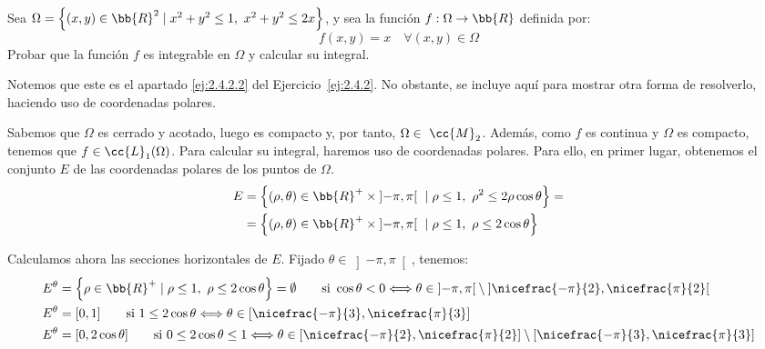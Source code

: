\begin{ejercicio}
    Sea $\Omega=\left\{(x,y)\in \bb{R}^2 \mid x^2+y^2\leq 1,~x^2+y^2\leq 2x\right\}$, y sea la función $f:\Omega\to \bb{R}$ definida por:
    \[ f(x,y) = x \quad \forall (x,y)\in \Omega \]
    Probar que la función \( f \) es integrable en \( \Omega \) y calcular su integral.

    \begin{observacion}
        Notemos que este es el apartado \ref{ej:2.4.2.2} del Ejercicio~\ref{ej:2.4.2}.
        No obstante, se incluye aquí para mostrar otra forma de resolverlo, haciendo uso de coordenadas polares.
    \end{observacion}

    Sabemos que $\Omega$ es cerrado y acotado, luego es compacto y, por tanto, $\Omega\in~\cc{M}_2$. Además, como $f$ es continua y $\Omega$ es compacto, tenemos que $f\in \cc{L}_1(\Omega)$.
    Para calcular su integral, haremos uso de coordenadas polares. Para ello, en primer lugar, obtenemos el conjunto $E$ de las coordenadas polares de los puntos de $\Omega$.
    \begin{align*}
        E &= \left\{ (\rho, \theta) \in \bb{R}^+\times \left]-\pi, \pi\right[ ~\mid \rho\leq 1,~\rho^2\leq 2\rho\cos\theta \right\} =\\
        &= \left\{ (\rho, \theta) \in \bb{R}^+\times \left]-\pi, \pi\right[ ~\mid \rho\leq 1,~\rho\leq 2\cos\theta \right\}
    \end{align*}

    Calculamos ahora las secciones horizontales de $E$. Fijado $\theta\in \left]-\pi, \pi\right[$, tenemos:
    \begin{align*}
        E^{\theta} &= \left\{ \rho\in \bb{R}^+ \mid \rho\leq 1,~\rho\leq 2\cos\theta \right\} = \emptyset \qquad \text{si } \cos\theta < 0 \Longleftrightarrow \theta\in \left]-\pi, \pi\right[\setminus \left]\nicefrac{-\pi}{2}, \nicefrac{\pi}{2}\right[\\
        E^{\theta} &= [0, 1] \qquad \text{si } 1\leq 2\cos\theta \Longleftrightarrow \theta\in \left[\nicefrac{-\pi}{3}, \nicefrac{\pi}{3}\right] \\
        E^{\theta} &= [0, 2\cos\theta] \qquad \text{si } 0\leq 2\cos\theta \leq 1 \Longleftrightarrow \theta\in \left[\nicefrac{-\pi}{2}, \nicefrac{\pi}{2}\right]\setminus \left[\nicefrac{-\pi}{3}, \nicefrac{\pi}{3}\right]
    \end{align*}


\end{ejercicio}
